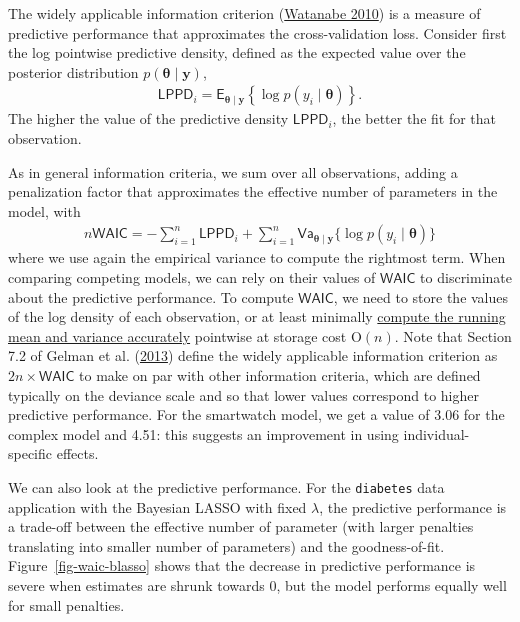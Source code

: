 \documentclass[
  11pt,
  letterpaper,
]{scrbook}
\theoremstyle{definition}
\theoremstyle{definition}
\theoremstyle{definition}
\theoremstyle{plain}
\theoremstyle{remark}
\begin{document}
The widely applicable information criterion
(\protect\hyperlink{ref-Watanabe:2010}{Watanabe 2010}) is a measure of
predictive performance that approximates the cross-validation loss.
Consider first the log pointwise predictive density, defined as the
expected value over the posterior distribution
\(p(\boldsymbol{\theta} \mid \boldsymbol{y})\), \begin{align*}
\mathsf{LPPD}_i = \mathsf{E}_{\boldsymbol{\theta} \mid \boldsymbol{y}} \left\{ \log p(y_i \mid \boldsymbol{\theta})\right\}.
\end{align*} The higher the value of the predictive density
\(\mathsf{LPPD}_i\), the better the fit for that observation.

As in general information criteria, we sum over all observations, adding
a penalization factor that approximates the effective number of
parameters in the model, with \begin{align*}
n\mathsf{WAIC} = -\sum_{i=1}^n \mathsf{LPPD}_i + \sum_{i=1}^n \mathsf{Va}_{\boldsymbol{\theta} \mid \boldsymbol{y}}\{\log p(y_i \mid \boldsymbol{\theta})\}
\end{align*} where we use again the empirical variance to compute the
rightmost term. When comparing competing models, we can rely on their
values of \(\mathsf{WAIC}\) to discriminate about the predictive
performance. To compute \(\mathsf{WAIC}\), we need to store the values
of the log density of each observation, or at least minimally
\href{https://www.johndcook.com/blog/standard_deviation/}{compute the
running mean and variance accurately} pointwise at storage cost
\(\mathrm{O}(n)\). Note that Section 7.2 of Gelman et al.
(\protect\hyperlink{ref-Gelman:2013}{2013}) define the widely applicable
information criterion as \(2n \times \mathsf{WAIC}\) to make on par with
other information criteria, which are defined typically on the deviance
scale and so that lower values correspond to higher predictive
performance. For the smartwatch model, we get a value of 3.06 for the
complex model and 4.51: this suggests an improvement in using
individual-specific effects.

We can also look at the predictive performance. For the
\texttt{diabetes} data application with the Bayesian LASSO with fixed
\(\lambda\), the predictive performance is a trade-off between the
effective number of parameter (with larger penalties translating into
smaller number of parameters) and the goodness-of-fit.
Figure~\ref{fig-waic-blasso} shows that the decrease in predictive
performance is severe when estimates are shrunk towards 0, but the model
performs equally well for small penalties.
\end{document}
